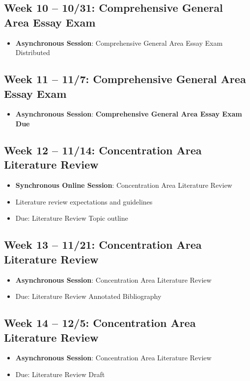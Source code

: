 \documentclass[12pt, letterpaper]{article}
\begin{document}
\subsection*{Week 10 -- 10/31: Comprehensive General Area Essay Exam}
\begin{itemize}
    \item \textbf{Asynchronous Session}: Comprehensive General Area Essay Exam Distributed
\end{itemize}   

\subsection*{Week 11 -- 11/7: Comprehensive General Area Essay Exam}
\begin{itemize}
    \item \textbf{Asynchronous Session}: \textbf{Comprehensive General Area Essay Exam Due}
\end{itemize}

\subsection*{Week 12 -- 11/14: Concentration Area Literature Review}
\begin{itemize}
    \item \textbf{Synchronous Online Session}: Concentration Area Literature Review
    \item Literature review expectations and guidelines
    \item Due: Literature Review Topic outline
\end{itemize}

\subsection*{Week 13 -- 11/21: Concentration Area Literature Review}
\begin{itemize}
    \item \textbf{Asynchronous Session}: Concentration Area Literature Review
    \item Due: Literature Review Annotated Bibliography
\end{itemize}

\subsection*{Week 14 -- 12/5: Concentration Area Literature Review}
\begin{itemize}
    \item \textbf{Asynchronous Session}: Concentration Area Literature Review
    \item Due: Literature Review Draft
\end{itemize}
\end{document}
